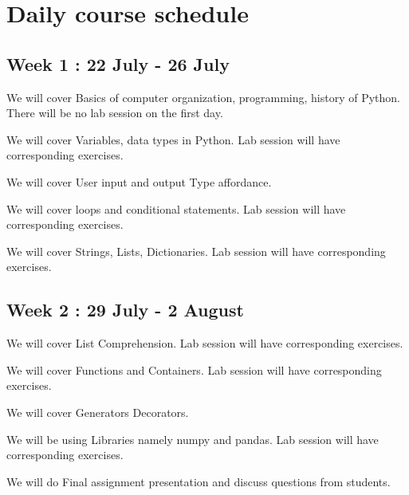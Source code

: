 \section{Daily course schedule}

\subsection{Week 1 : 22 July - 26 July}
We will cover Basics of computer organization, programming, history of Python.
There will be no lab session on the first day.

We will cover Variables, data types in Python.
Lab session will have corresponding exercises.

We will cover User input and output Type affordance.

We will cover loops and conditional statements.
Lab session will have corresponding exercises.

We will cover Strings, Lists, Dictionaries.
Lab session will have corresponding exercises.

\subsection{Week 2 : 29 July - 2 August}

We will cover List Comprehension.
Lab session will have corresponding exercises.

We will cover Functions and Containers.
Lab session will have corresponding exercises.

We will cover Generators Decorators.

We will be using Libraries  namely numpy and pandas.
Lab session will have corresponding exercises.

We will do Final assignment presentation and discuss questions from students.

